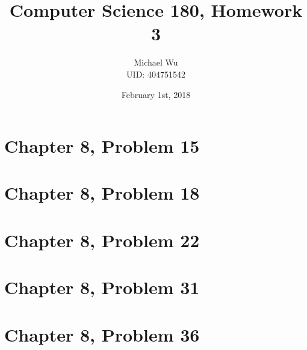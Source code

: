 \documentclass[12pt]{article}
\begin{document}
\title{Computer Science 180, Homework 3}
\date{February 1st, 2018}
\author{Michael Wu\\UID: 404751542}
\maketitle

\section*{Chapter 8, Problem 15}

\pagebreak

\section*{Chapter 8, Problem 18}

\pagebreak

\section*{Chapter 8, Problem 22}

\pagebreak

\section*{Chapter 8, Problem 31}

\pagebreak

\section*{Chapter 8, Problem 36}
\end{document}
